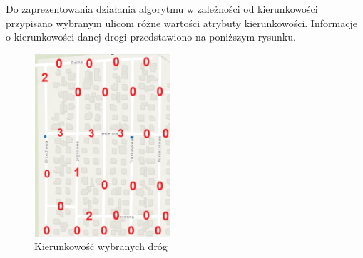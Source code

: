 \documentclass{article}
\begin{document}
Do zaprezentowania działania algorytmu w zależności od kierunkowości przypisano wybranym ulicom różne wartości atrybuty kierunkowości. Informacje o kierunkowości danej
drogi przedstawiono na poniższym rysunku.
\begin{figure}[H]
    \centering
    \includegraphics[width=0.45\textwidth]{img/kierunek-opis.png}
    \caption{Kierunkowość wybranych dróg}
\end{figure}
\end{document}
